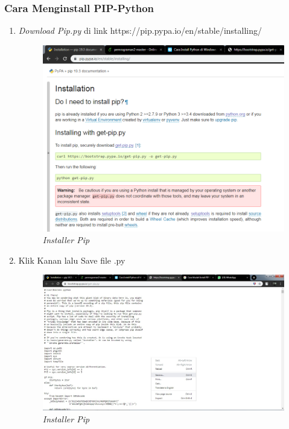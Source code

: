 \subsubsection{Cara Menginstall PIP-Python}
\begin{enumerate}
\item \textit{Download Pip.py}
    di link https://pip.pypa.io/en/stable/installing/
    \begin{figure}[!htbp]
    \centering
    \includegraphics[scale=0.5]{figures/pip11.PNG}
    \caption{\textit{Installer Pip}}
    \label{Figurepython}
    \end{figure}
\item Klik Kanan lalu Save file .py
     \begin{figure}[!htbp]
    \centering
    \includegraphics[scale=0.2]{figures/pip12.png}
    \caption{\textit{Installer Pip}}
    \label{Figurepython}
    \end{figure}

\end{enumerate}
